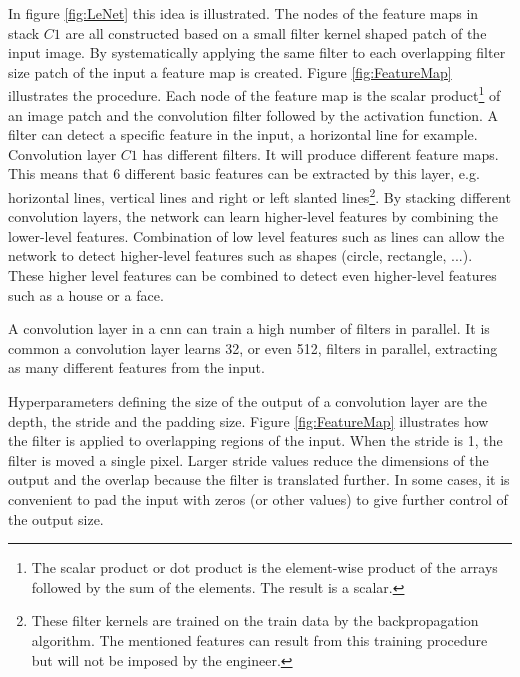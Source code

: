 \par{
    In figure \ref{fig:LeNet} this idea is illustrated. 
    The nodes of the feature maps in stack $C1$ are all constructed based on a small filter kernel shaped patch of the input image.
    By systematically applying the same filter to each overlapping filter size patch of the input a feature map is created. 
    Figure \ref{fig:FeatureMap} illustrates the procedure. 
    Each node of the feature map is the scalar product\footnote{The scalar product or dot product is the element-wise product of the arrays followed by the sum of the elements. The result is a scalar.} 
    of an image patch and the convolution filter followed by the activation function.
    A filter can detect a specific feature in the input, a horizontal line for example. 
    Convolution layer $C1$ has different filters. 
    It will produce different feature maps.
    This means that 6 different basic features can be extracted by this layer, e.g. horizontal lines, vertical lines and right or left slanted lines\footnote{
        These filter kernels are trained on the train data by the backpropagation algorithm. The mentioned features can result from this training procedure but will not be imposed by the engineer.
        }.
    By stacking different convolution layers, the network can learn higher-level features by combining the lower-level features.
    Combination of low level features such as lines can allow the network to detect higher-level features such as shapes (circle, rectangle, ...).
    These higher level features can be combined to detect even higher-level features such as a house or a face.
}
\par{
    A convolution layer in a \Gls{cnn} can train a high number of filters in parallel.
    It is common a convolution layer learns 32, or even 512, filters in parallel, extracting as many different features from the input. 
}
\par{
    Hyperparameters defining the size of the output of a convolution layer are the depth, the stride and the padding size.
    Figure \ref{fig:FeatureMap} illustrates how the filter is applied to overlapping regions of the input. When the stride is 1, the filter is moved a single pixel.
    Larger stride values reduce the dimensions of the output and the overlap because the filter is translated further.
    In some cases, it is convenient to pad the input with zeros (or other values) to give further control of the output size.}

